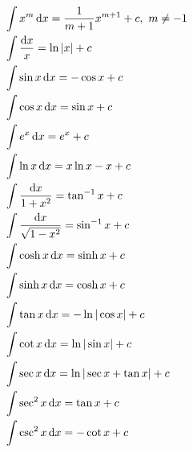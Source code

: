 \begin{align*}
&\int x^m\der x = \frac{1}{m+1}x^{m+1}+c,\ m\ne -1\\
&\int \frac{\der x}{x} = \ln |x|+c\\
&\int \sin x\der x = -\cos x+c\\
&\int \cos x\der x = \sin x+c\\
&\int e^x\der x = e^x +c\\
&\int \ln x \der x = x \ln x - x+c\\
&\int \frac{\der x}{1+x^2}  = \tan^{-1} x+c\\
&\int \frac{\der x}{\sqrt{1-x^2}}  = \sin^{-1} x+c\\
&\int \cosh x \der x = \sinh x+c\\
&\int \sinh x \der x = \cosh x+c\\
&\int \tan x\der x = -\ln|\cos x|+c\\
&\int \cot x\der x = \ln|\sin x|+c\\
&\int \sec x\der x = \ln|\sec x +\tan x| +c\\
&\int \sec ^2 x\der x = \tan x +c\\
&\int \csc ^2 x\der x = -\cot x +c
\end{align*}
